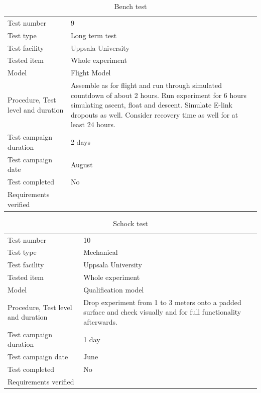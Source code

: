 \documentclass[12pt,a4paper]{report}
\begin{document}
\begin{table}[H]
\centering
\caption{Bench test}
\label{tab:test_bench}
\begin{tabular}{L{5cm}L{10cm}}
\toprule
Test number & 9 \\
Test type & Long term test \\
Test facility & Uppsala University \\
Tested item & Whole experiment \\
Model & Flight Model \\
Procedure, Test level and duration & Assemble as for flight and run through simulated countdown of about 2 hours. Run experiment for 6 hours simulating ascent, float and descent. Simulate E-link dropouts as well. Consider recovery time as well for at least 24 hours. \\
Test campaign duration & 2 days \\
Test campaign date & August \\
Test completed & No \\
Requirements verified & \\
\bottomrule
\end{tabular}
\end{table}

\begin{table}[H]
\centering
\caption{Schock test}
\label{tab:test2}
\begin{tabular}{L{5cm}L{10cm}}
\toprule
Test number & 10 \\
Test type & Mechanical \\
Test facility & Uppsala University \\
Tested item & Whole experiment \\
Model & Qualification model \\
Procedure, Test level and duration & Drop experiment from 1 to 3 meters onto a padded surface and check visually and for full functionality afterwards. \\
Test campaign duration & 1 day \\
Test campaign date & June \\
Test completed & No \\
Requirements verified & \\
\bottomrule
\end{tabular}
\end{table}
\end{document}
